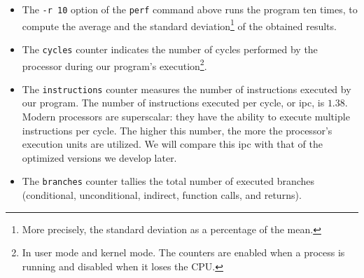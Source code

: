 \documentclass[12pt,a4paper,twoside,openright]{book}
\begin{document}
\begin{itemize}
\item The \texttt{-r 10} option of the \texttt{perf} command above runs the program ten times, to compute the average and the standard deviation\footnote{More precisely, the standard deviation as a percentage of the mean.} of the obtained results.
\item The \texttt{cycles} counter indicates the number of cycles performed by the processor during our program's execution\footnote{In user mode and kernel mode. The counters are enabled when a process is running and disabled when it loses the CPU.}.
\item The \texttt{instructions} counter measures the number of instructions executed by our program. The number of instructions executed per cycle, or \gls{ipc}, is $1.38$. Modern processors are superscalar: they have the ability to execute multiple instructions per cycle. The higher this number, the more the processor's execution units are utilized. We will compare this \gls{ipc} with that of the optimized versions we develop later.
\item The \texttt{branches} counter tallies the total number of executed branches (conditional, unconditional, indirect, function calls, and returns).

\end{itemize}
\end{document}
